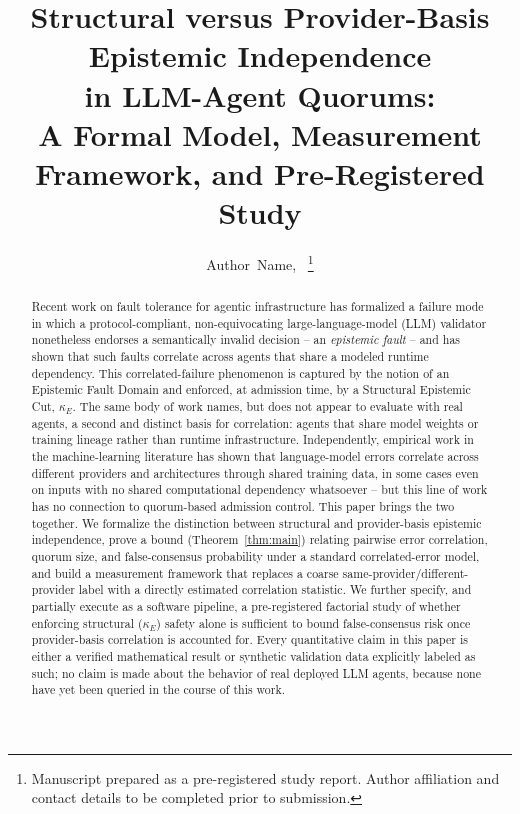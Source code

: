 \documentclass[journal]{IEEEtran}
\begin{document}
\title{Structural versus Provider-Basis Epistemic Independence\\ in LLM-Agent Quorums:\\ A Formal Model, Measurement Framework, and Pre-Registered Study}

\author{Author~Name,~
\thanks{Manuscript prepared as a pre-registered study report. Author affiliation and contact details to be completed prior to submission.}}


\maketitle

\begin{abstract}
Recent work on fault tolerance for agentic infrastructure has formalized a failure mode in which a protocol-compliant, non-equivocating large-language-model (LLM) validator nonetheless endorses a semantically invalid decision -- an \emph{epistemic fault} -- and has shown that such faults correlate across agents that share a modeled runtime dependency. This correlated-failure phenomenon is captured by the notion of an Epistemic Fault Domain and enforced, at admission time, by a Structural Epistemic Cut, $\kappa_E$. The same body of work names, but does not appear to evaluate with real agents, a second and distinct basis for correlation: agents that share model weights or training lineage rather than runtime infrastructure. Independently, empirical work in the machine-learning literature has shown that language-model errors correlate across different providers and architectures through shared training data, in some cases even on inputs with no shared computational dependency whatsoever -- but this line of work has no connection to quorum-based admission control. This paper brings the two together. We formalize the distinction between structural and provider-basis epistemic independence, prove a bound (Theorem~\ref{thm:main}) relating pairwise error correlation, quorum size, and false-consensus probability under a standard correlated-error model, and build a measurement framework that replaces a coarse same-provider/different-provider label with a directly estimated correlation statistic. We further specify, and partially execute as a software pipeline, a pre-registered factorial study of whether enforcing structural ($\kappa_E$) safety alone is sufficient to bound false-consensus risk once provider-basis correlation is accounted for. Every quantitative claim in this paper is either a verified mathematical result or synthetic validation data explicitly labeled as such; no claim is made about the behavior of real deployed LLM agents, because none have yet been queried in the course of this work.
\end{abstract}
\end{document}
